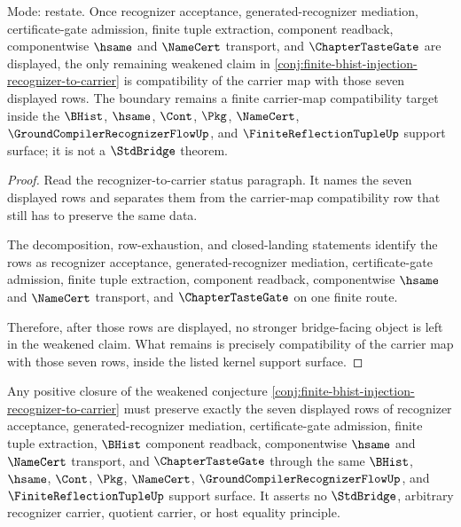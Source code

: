 \begin{theorem}
\label{thm:finite-bhist-injection-carrier-map-compatibility-boundary}
Mode: restate. Once recognizer acceptance, generated-recognizer mediation, certificate-gate admission, finite tuple extraction, component readback, componentwise $\hsame$ and $\NameCert$ transport, and $\ChapterTasteGate$ are displayed, the only remaining weakened claim in \autoref{conj:finite-bhist-injection-recognizer-to-carrier} is compatibility of the carrier map with those seven displayed rows. The boundary remains a finite carrier-map compatibility target inside the $\BHist$, $\hsame$, $\Cont$, $\Pkg$, $\NameCert$, $\GroundCompilerRecognizerFlowUp$, and $\FiniteReflectionTupleUp$ support surface; it is not a $\StdBridge$ theorem.
\end{theorem}
\begin{proof}
Read the recognizer-to-carrier status paragraph. It names the seven displayed rows and separates them from the carrier-map compatibility row that still has to preserve the same data.

The decomposition, row-exhaustion, and closed-landing statements identify the rows as recognizer acceptance, generated-recognizer mediation, certificate-gate admission, finite tuple extraction, component readback, componentwise $\hsame$ and $\NameCert$ transport, and $\ChapterTasteGate$ on one finite route.

Therefore, after those rows are displayed, no stronger bridge-facing object is left in the weakened claim. What remains is precisely compatibility of the carrier map with those seven rows, inside the listed kernel support surface.
\end{proof}

\begin{proposition}
\label{prop:finite-bhist-injection-carrier-map-kernel-support-boundary}
Any positive closure of the weakened conjecture \autoref{conj:finite-bhist-injection-recognizer-to-carrier} must preserve exactly the seven displayed rows of recognizer acceptance, generated-recognizer mediation, certificate-gate admission, finite tuple extraction, $\BHist$ component readback, componentwise $\hsame$ and $\NameCert$ transport, and $\ChapterTasteGate$ through the same $\BHist$, $\hsame$, $\Cont$, $\Pkg$, $\NameCert$, $\GroundCompilerRecognizerFlowUp$, and $\FiniteReflectionTupleUp$ support surface. It asserts no $\StdBridge$, arbitrary recognizer carrier, quotient carrier, or host equality principle.
\end{proposition}


